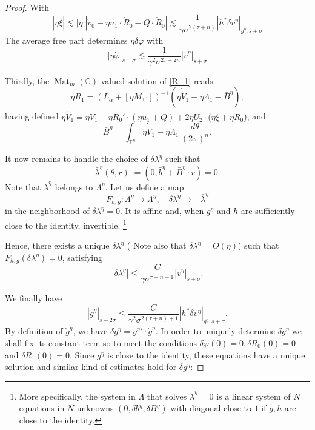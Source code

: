\documentclass[oneside, 11pt]{amsbook}
\newcommand{\comment}[1]{}
\newcommand{\abs}[1]{{\left|#1\right|}}
\newcommand{\T}{\mathbb{T}}
\newcommand{\C}{\mathbb{C}}
\newcommand{\teta}{\theta}
\newcommand{\eps}{\varepsilon}
\newcommand{\Mat}{\operatorname{Mat}}
\newcommand{\average}[1]{\int_{\T^n}#1}
\newcommand{\0}{{(0)}}
\newcommand{\3}{{(3)}}
\numberwithin{equation}{section}
\numberwithin{defn}{section}
\numberwithin{prop}{section}
\numberwithin{cor}{section}
\numberwithin{lemma}{section}
\numberwithin{rmk}{section}
\numberwithin{corollary}{section}
\begin{document}
\begin{proof}
With 
$$
|\eta \dot\xi| \lesssim |\eta| |\dot v_{0} - \eta u_{1}\cdot \dot R_{0} -  Q\cdot\dot R_{0}|
\lesssim \frac{1}{\gamma\sigma^{2(\tau + n)}} |h^*\delta v^\eta|_{g^\eta,s+\sigma}  $$
The average free part determines $\eta\delta\varphi$ with
$$
\abs{\eta\dot\varphi}_{s-\sigma} \lesssim \frac{1}{\gamma^{2}\sigma^{2\tau + 2n}} \abs{\dot v^\eta}_{s+\sigma}
$$

Thirdly, the $\Mat_m(\C)$-valued solution of \eqref{R_1} reads
\[\eta \dot{R}_1 = (L_\alpha + [\eta M,\cdot])^{-1} (\eta \dot{\tilde{V}}_1 - \eta\dot{\Lambda}_1 - \bar{B}^\eta),\]
having defined $\eta\dot{\tilde{V}}_1= \eta\dot{V}_1 -\eta \dot{R}_0'\cdot (\eta u_1 + Q) +2 \eta U_2\cdot  (\eta\dot\xi + \eta\dot{R}_0$), and 
$$\bar{B}^\eta=\int_{\T^n} \eta \dot{\tilde{V}}_1- \eta\dot{\Lambda}_1 \,\frac{d\teta}{(2\pi)^n}.$$

It now remains to handle the choice of $\delta\lambda^\eta$ such that $$\bar\lambda^\eta(\teta,r) := (0,\bar b^\eta + \bar B^\eta\cdot r)=0.$$
Note that $\bar\lambda^\eta$ belongs to $\Lambda^\eta$. Let us define a map $$ F_{h,g}: \Lambda^\eta\to \Lambda^\eta,\quad \delta\lambda^\eta\mapsto - \bar\lambda^\eta $$ in the neighborhood of $\delta\lambda^\eta=0$. %
It is affine and, when $g^\eta$ and $h$ are sufficiently close to the identity, invertible. \footnote{More specifically, the system in $\Lambda$ that solves $\bar\lambda^\eta =0$ is a linear system of $N$ equations in $N$ unknowns $(0,  \delta b^\eta, \delta B^\eta)$ 
with diagonal close to $1$ if $g,h$ are close to the identity.}
\comment{ say $\eps_0$-close to the identity in the $\abs{\,\cdot\,}_{s_0}$-norm ($s_0<s<s+\sigma$),} 
\comment{$F'$ is bounded away from $0$, and $\delta\lambda\mapsto -\bar \lambda$ is invertible. Note in particular that $-\bar\lambda$ is affine in $\delta\lambda$, the system to solve being triangular of the form $\average{a(g,\dot{v}) + A(g)\cdot\delta\lambda}=0$, with diagonal close to $1$ if the smalleness condition above is assumed,}

Hence, there exists a unique $\delta\lambda^\eta$ ( Note also that $\delta\lambda^\eta = O(\eta)$) such that $F_{h,g}(\delta\lambda^\eta)=0$, satisfying $$\abs{\delta\lambda^\eta} \leq \frac{C}{\gamma\sigma^{\tau + n +1}}\abs{\dot v^\eta}_{s+\sigma}.$$

We finally have  
\[\abs{\dot{g}^\eta}_{s-2\sigma} \leq \frac{C}{\gamma^2\sigma^{2(\tau +n) +1}}\abs{h^*\delta v^\eta}_{g^\eta,s+\sigma}. \]
By definition of $\dot g^\eta$, we have $\delta g^\eta = {g^\eta}'\cdot \dot g^\eta$. In order to uniquely determine $\delta g^\eta$ we shall fix its constant term so to meet the conditions $\delta\varphi(0)=0, \delta R_0(0)=0$ and $\delta R_1(0)=0$. Since $g^\eta$ is close to the identity, these equations have a unique solution and similar kind of estimates hold for $\delta g^\eta$:


\end{proof}
\end{document}
